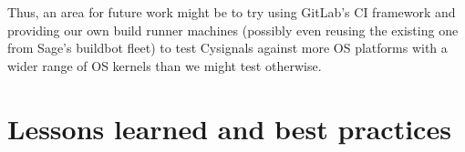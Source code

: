 \documentclass{deliverablereport}
\begin{document}
Thus, an area for future work might be to try using GitLab's CI framework and
providing our own build runner machines (possibly even reusing the existing one
from Sage's buildbot fleet) to test Cysignals against more OS platforms with a
wider range of OS kernels than we might test otherwise.

\hypertarget{best-practices}{%
\section{Lessons learned and best practices}\label{best-practices}}
\end{document}
